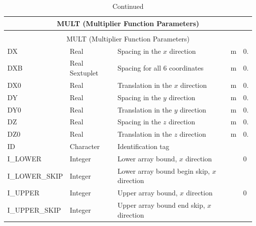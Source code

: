 \documentclass[11pt]{book}
\begin{document}
\begin{longtable}{@{\extracolsep{\fill}}|l|l|l|l|l|}
\caption[Multiplier function parameters ({\ct MULT} namelist group)]{For more information see Section~\ref{info:MULT}.}
\label{tbl:MULT} \\
\hline
\multicolumn{5}{|c|}{{\ct MULT} (Multiplier Function Parameters)} \\
\hline \hline
\endfirsthead
\caption[]{Continued} \\
\hline
\multicolumn{5}{|c|}{{\ct MULT} (Multiplier Function Parameters)} \\
\hline \hline
\endhead
{\ct DX}             & Real             & Spacing in the $x$ direction                & m  & 0.                         \\ \hline
{\ct DXB}            & Real Sextuplet   & Spacing for all 6 coordinates               & m  & 0.                         \\ \hline
{\ct DX0}            & Real             & Translation in the $x$ direction            & m  & 0.                         \\ \hline
{\ct DY}             & Real             & Spacing in the $y$ direction                & m  & 0.                         \\ \hline
{\ct DY0}            & Real             & Translation in the $y$ direction            & m  & 0.                         \\ \hline
{\ct DZ}             & Real             & Spacing in the $z$ direction                & m  & 0.                         \\ \hline
{\ct DZ0}            & Real             & Translation in the $z$ direction            & m  & 0.                         \\ \hline
{\ct ID }            & Character        & Identification tag                          &    &                            \\ \hline
{\ct I\_LOWER}       & Integer          & Lower array bound, $x$ direction            &    & 0                          \\ \hline
{\ct I\_LOWER\_SKIP} & Integer          & Lower array bound begin skip, $x$ direction &    &                            \\ \hline
{\ct I\_UPPER}       & Integer          & Upper array bound, $x$ direction            &    & 0                          \\ \hline
{\ct I\_UPPER\_SKIP} & Integer          & Upper array bound end skip, $x$ direction   &    &                            \\ \hline

\end{longtable}
\end{document}

